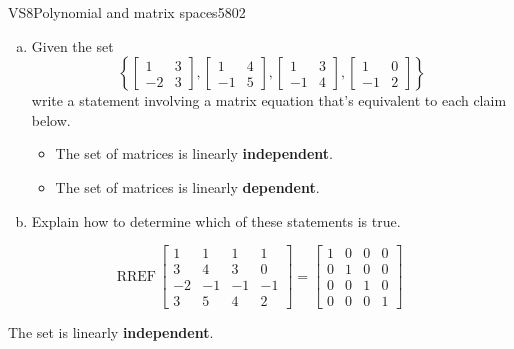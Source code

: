 \begin{exercise}{VS8}{Polynomial and matrix spaces}{5802} 
\begin{exerciseStatement} 

\begin{enumerate}[(a)]
\item  

 Given the set \[\left\{ \left[\begin{array}{cc}
1 & 3 \\
-2 & 3
\end{array}\right] , \left[\begin{array}{cc}
1 & 4 \\
-1 & 5
\end{array}\right] , \left[\begin{array}{cc}
1 & 3 \\
-1 & 4
\end{array}\right] , \left[\begin{array}{cc}
1 & 0 \\
-1 & 2
\end{array}\right] \right\}\] write a statement involving a matrix equation that's equivalent to each claim below. 

 

\begin{itemize}
\item  

 The set of matrices is linearly \textbf{independent}. 

 
\item  

 The set of matrices is linearly \textbf{dependent}. 

 
\end{itemize}

     
\item  

 Explain how to determine which of these statements is true. 

 
\end{enumerate}

     \end{exerciseStatement}
 \begin{exerciseAnswer} 

 \[
\mathrm{RREF}\, \left[\begin{array}{cccc}
1 & 1 & 1 & 1 \\
3 & 4 & 3 & 0 \\
-2 & -1 & -1 & -1 \\
3 & 5 & 4 & 2
\end{array}\right] = \left[\begin{array}{cccc}
1 & 0 & 0 & 0 \\
0 & 1 & 0 & 0 \\
0 & 0 & 1 & 0 \\
0 & 0 & 0 & 1
\end{array}\right]
            \] 

 

 The set is linearly \textbf{independent}. 

 \end{exerciseAnswer}
 \end{exercise}


